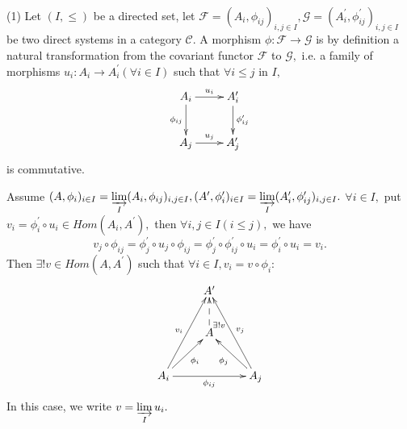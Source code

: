 \begin{remarks}\
\enum
\item[(1)]Let $(I,\leqslant)$ be a directed set, let
$\mathscr{F}=(A_i,\phi_{ij})_{i,j\in I},
\mathscr{G}=(A_i^{\prime},\phi_{ij}^{\prime})_{i,j\in I}$ be two
direct systems in a category $\mathscr{C}.$ A morphism $\phi:
\mathscr{F}\rightarrow \mathscr{G}$ is by definition a natural
transformation from the covariant functor $\mathscr{F}$ to
$\mathscr{G},$ i.e. a family of morphisms $u_i: A_i\rightarrow
A_i^{\prime}(\forall i\in I)$ such that $\forall i\leqslant j$ in
$I,$
\[ \xymatrix{
   A_i \ar[d]_{\phi_{ij}} \ar[r]^-{u_i} & A_i^{\prime}
   \ar[d]^{\phi_{ij}^{\prime}}                      \\
   A_j \ar[r]^-{u_j} & A_j^{\prime} }  \]
is commutative.

Assume $(A,\phi_i)_{i\in I} =
\varinjlim\limits_I(A_i,\phi_{ij})_{i,j\in I},
(A^{\prime},\phi_i^{\prime})_{i\in I} =
\varinjlim\limits_I(A_i^{\prime},\phi_{ij}^{\prime})_{i,j\in I}.$
$\forall i\in I,$ put $v_i=\phi_i^{\prime}\circ u_i\in
Hom(A_i,A^{\prime}),$ then $\forall i,j\in I(i\leqslant j),$ we have
$$v_j\circ\phi_{ij}=\phi_j^{\prime}\circ u_j\circ\phi_{ij}=
\phi_j^{\prime}\circ\phi_{ij}^{\prime}\circ u_i=\phi_i^{\prime}\circ
u_i=v_i.$$ Then $\exists!v\in Hom(A,A^{\prime})$ such that $\forall
i\in I, v_i=v\circ \phi_i:$
\[ \xymatrix{
   & A^{\prime} \\
   & A \ar@{-->}[u]_(.2){\exists! v} \\
   A_i \ar[rr]_-{\phi_{ij}} \ar"1,2"^{v_i} \ar[ur]_-{\phi_i} & & A_j
   \ar"1,2"_{v_j} \ar[ul]^-{\phi_j} }  \]
In this case, we write $v=\varinjlim\limits_I u_i.$


\end{remarks}
